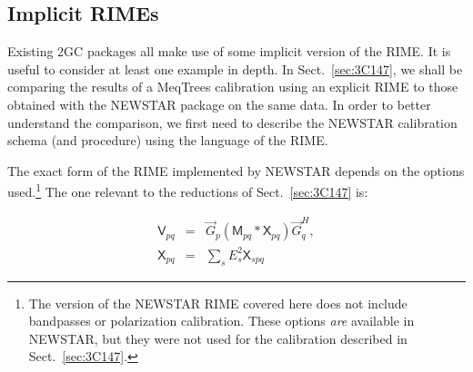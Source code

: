 \documentclass[]{aa}
\newcommand{\herm}{H}
\newcommand{\jones}[2]{\vec {#1}_{#2}}
\newcommand{\jonesT}[2]{\vec {#1}^{\herm}_{#2}}
\newcommand{\coh}[2]{\mathsf{{#1}}_{{#2}}}
\begin{document}
\subsection{\label{sec:implicit-me-newstar}Implicit RIMEs}

Existing 2GC packages all make use of some implicit version of the RIME. It is useful to consider at least one example in depth. In Sect.~\ref{sec:3C147}, we shall be comparing the results of a MeqTrees calibration using an explicit RIME to those obtained with the NEWSTAR package on the same data. In order to better understand the comparison, we first need to describe the NEWSTAR calibration schema (and procedure) using the language of the RIME.

The exact form of the RIME implemented by NEWSTAR depends on the options used.\footnote{The version of the NEWSTAR RIME covered here does not include bandpasses or polarization calibration. These options \emph{are} available in NEWSTAR, but they were not used for the calibration described in Sect.~\ref{sec:3C147}.} The one relevant to the reductions of Sect.~\ref{sec:3C147} is:

\begin{eqnarray}\label{eq:newstar-rime}
\coh{V}{pq} & = & \jones{G}{p} \left ( \coh{M}{pq} \ast \coh{X}{pq} \right ) \jonesT{G}{q}, \\
\nonumber \coh{X}{pq} & = & \sum_{s} E^2_s \coh{X}{spq} 
\end{eqnarray}
\end{document}
